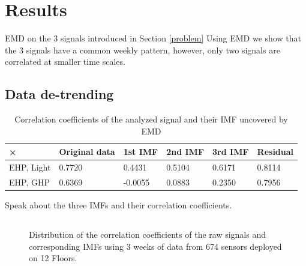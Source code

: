 \section{Results}
EMD on the 3 signals introduced in Section \ref{problem}
Using EMD we show that the 3 signals have a common weekly pattern, however, only two signals are correlated at smaller time scales.

\subsection{Data de-trending}
\begin{table}
\begin{center}
\begin{tabular}{|l|l|l|l|l|l|}
\hline
× & Original data & 1st IMF & 2nd IMF & 3rd IMF & Residual\\ \hline
EHP, Light & 0.7720 & 0.4431 & 0.5104 & 0.6171 & 0.8114\\ \hline
EHP, GHP & 0.6369 & -0.0055 & 0.0883 & 0.2350 & 0.7956\\ \hline
\end{tabular}

\caption{Correlation coefficients of the analyzed signal and their IMF uncovered by EMD}

\end{center}
\end{table}

Speak about the three IMFs and their correlation coefficients.



\subsection{}
\begin{figure}
\centering
 \caption{Distribution of the correlation coefficients of the raw signals and corresponding IMFs using 3 weeks of data from 674 sensors deployed on 12 Floors.}
\end{figure}
